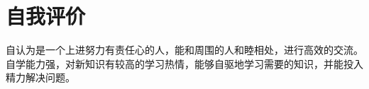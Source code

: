\documentclass{resume}
\begin{document}
\section{自我评价}
\qquad 自认为是一个上进努力有责任心的人，能和周围的人和睦相处，进行高效的交流。自学能力强，对新知识有较高的学习热情，能够自驱地学习需要的知识，并能投入精力解决问题。


%  
\end{document}
